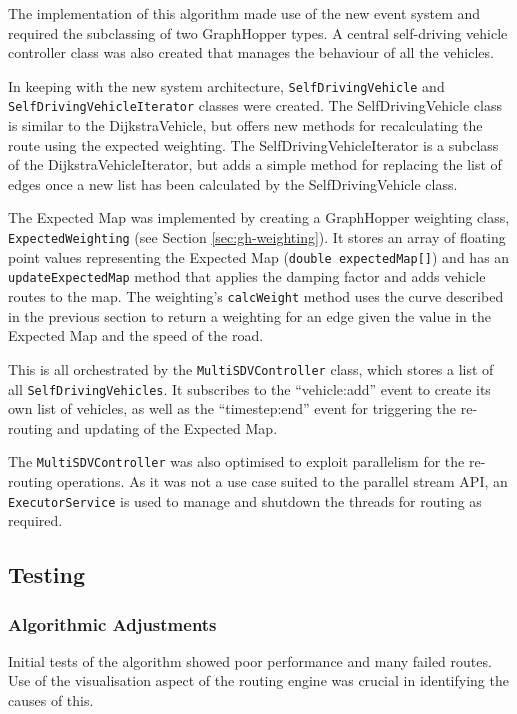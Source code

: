 \documentclass[ %
                    author={Alexander Hill},
                supervisor={Dr. Benjamin Sach},
                    degree={MEng},
                     title={MARMOSET},
                  subtitle={Multi-Agent Route Management using Online Simulation for Efficient Transportation},
                      type={research},
                      year={2016} ]{dissertation}
\begin{document}
The implementation of this algorithm made use of the new event system and
required the subclassing of two GraphHopper types. A central self-driving vehicle
controller class was also created that manages the behaviour of all the
vehicles.

In keeping with the new system architecture, \texttt{SelfDrivingVehicle} and
\texttt{SelfDrivingVehicleIterator} classes were created. The SelfDrivingVehicle
class is similar to the DijkstraVehicle, but offers new methods for
recalculating the route using the expected weighting. The
SelfDrivingVehicleIterator is a subclass of the DijkstraVehicleIterator, but
adds a simple method for replacing the list of edges once a new list has been
calculated by the SelfDrivingVehicle class.

The Expected Map was implemented by creating a GraphHopper weighting class,
\texttt{ExpectedWeighting} (see Section \ref{sec:gh-weighting}). It stores an
array of floating point values representing the Expected Map (\texttt{double
expectedMap[]}) and has an \texttt{updateExpectedMap} method that applies the
damping factor and adds vehicle routes to the map. The weighting's
\texttt{calcWeight} method uses the curve described in the previous section to
return a weighting for an edge given the value in the Expected Map and the speed
of the road.

This is all orchestrated by the \texttt{MultiSDVController} class, which stores
a list of all \texttt{SelfDrivingVehicles}. It subscribes to the ``vehicle:add'' event
to create its own list of vehicles, as well as the ``timestep:end'' event for
triggering the re-routing and updating of the Expected Map.

The \texttt{MultiSDVController} was also optimised to exploit parallelism for the
re-routing operations. As it was not a use case suited to the parallel stream
API, an \texttt{ExecutorService} is used to manage and shutdown the threads for
routing as required.

\subsection{Testing}

\subsubsection{Algorithmic Adjustments}

Initial tests of the algorithm showed poor performance and many failed routes.
Use of the visualisation aspect of the routing engine was crucial in identifying
the causes of this.
\end{document}
